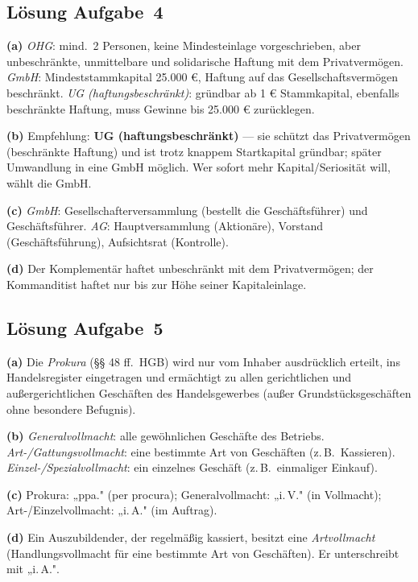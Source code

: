 \documentclass[11pt, a4paper]{article}
\begin{document}
\subsection*{Lösung Aufgabe~4}
\begin{loesung}
\textbf{(a)} \emph{OHG}: mind.\ 2 Personen, keine Mindesteinlage vorgeschrieben, aber
unbeschränkte, unmittelbare und solidarische Haftung mit dem Privatvermögen.
\emph{GmbH}: Mindeststammkapital 25.000 €, Haftung auf das Gesellschaftsvermögen
beschränkt. \emph{UG (haftungsbeschränkt)}: gründbar ab 1 € Stammkapital, ebenfalls
beschränkte Haftung, muss Gewinne bis 25.000 € zurücklegen.

\textbf{(b)} Empfehlung: \textbf{UG (haftungsbeschränkt)} --- sie schützt das Privat\-vermögen
(beschränkte Haftung) und ist trotz knappem Startkapital gründbar; später Umwandlung in
eine GmbH möglich. Wer sofort mehr Kapital/Seriosität will, wählt die GmbH.

\textbf{(c)} \emph{GmbH}: Gesellschafterversammlung (bestellt die Geschäftsführer) und
Geschäftsführer. \emph{AG}: Hauptversammlung (Aktionäre), Vorstand (Geschäftsführung),
Aufsichtsrat (Kontrolle).

\textbf{(d)} Der Komplementär haftet unbeschränkt mit dem Privatvermögen; der Kommanditist
haftet nur bis zur Höhe seiner Kapitaleinlage.
\end{loesung}

\subsection*{Lösung Aufgabe~5}
\begin{loesung}
\textbf{(a)} Die \emph{Prokura} (§§ 48 ff.\ HGB) wird nur vom Inhaber ausdrücklich erteilt,
ins Handelsregister eingetragen und ermächtigt zu allen gerichtlichen und außer\-gerichtlichen
Geschäften des Handelsgewerbes (außer Grundstücksgeschäften ohne besondere Befugnis).

\textbf{(b)} \emph{Generalvollmacht}: alle gewöhnlichen Geschäfte des Betriebs.
\emph{Art-/Gattungsvollmacht}: eine bestimmte Art von Geschäften (z.\,B.\ Kassieren).
\emph{Einzel-/Spezialvollmacht}: ein einzelnes Geschäft (z.\,B.\ einmaliger Einkauf).

\textbf{(c)} Prokura: „ppa." (per procura); Generalvollmacht: „i.\,V." (in Vollmacht);
Art-/Einzelvollmacht: „i.\,A." (im Auftrag).

\textbf{(d)} Ein Auszubildender, der regelmäßig kassiert, besitzt eine \emph{Artvollmacht}
(Handlungsvollmacht für eine bestimmte Art von Geschäften). Er unterschreibt mit „i.\,A.".
\end{loesung}
\end{document}
